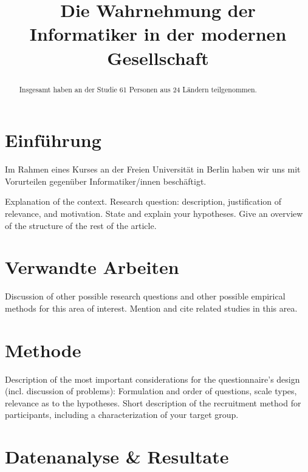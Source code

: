 \documentclass[de]{agse-empir-report}\usepackage[]{graphicx}\usepackage[]{color}
\begin{document}
\title{Die Wahrnehmung der Informatiker in der modernen Gesellschaft}
\author{
    \and
    \and
}

\maketitle



\begin{abstract}
    \lipsum[1]
    Insgesamt haben an der Studie 61 Personen
    aus 24 Ländern teilgenommen.
\end{abstract}


\section[fz]{Einführung}

Im Rahmen eines Kurses an der Freien Universität in Berlin haben wir uns mit Vorurteilen gegenüber Informatiker/innen beschäftigt.


Explanation of the context.
Research question: description, justification of relevance,
and motivation.
State and explain your hypotheses.
Give an overview of the structure of the rest of the article.


\section[kk]{Verwandte Arbeiten}

Discussion of other possible research questions and other possible
empirical methods for this area of interest.
Mention and cite related studies in this area.

\lipsum[3]


\section[jk]{Methode}

Description of the most important considerations for the
questionnaire's design (incl. discussion of problems):
Formulation and order of questions, scale types, relevance as to the
hypotheses.
Short description of the recruitment method for participants,
including a characterization of your target group.

\lipsum[4]


\section[pb]{Datenanalyse \& Resultate}
\end{document}
